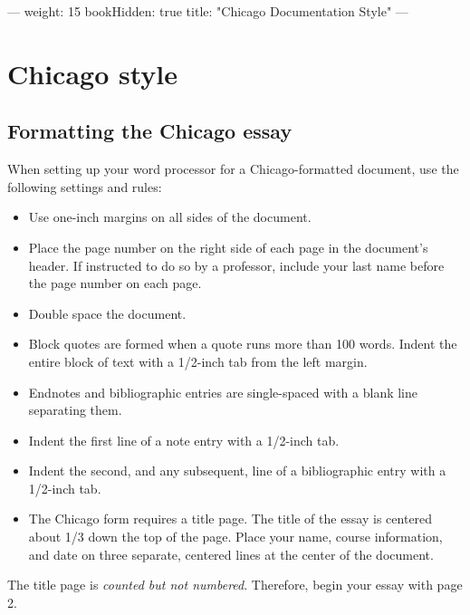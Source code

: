 ---
weight: 15
bookHidden: true
title: "Chicago Documentation Style"
---

\chapter{Chicago style}

\section{Formatting the Chicago essay}

When setting up your word processor for a Chicago-formatted document, use the
following settings and rules:

\begin{itemize} 

\item Use one-inch margins on all sides of the document. 

\item Place the page number on the right side of each page in the
document's header. If instructed to do so by a professor, include your last name before the page number on each page. 

\item Double space the document. 

\item Block quotes are formed when a quote runs more than 100 words. Indent the entire  block of text
with a 1/2-inch tab from the left margin. 
\item Endnotes and bibliographic entries are single-spaced with a blank line separating them. 
\item Indent the first line of a note entry with a 1/2-inch tab. 
\item Indent the second, and any subsequent, line of a bibliographic entry with a 1/2-inch tab. 
\item The Chicago form requires a title page. The title of the essay is centered about  1/3 down
the top of the page. Place your name, course information, and date on three
separate, centered lines at the center of the document.
\end{itemize}
\bigskip

\begin{center}
\begin{tcolorbox}[colframe=oyster, coltitle=black, sharp corners, title=\ding{52} Note!]
The title page is \emph{counted but not
numbered}. Therefore,  begin your essay with page 2.
\end{tcolorbox}
\end{center}


